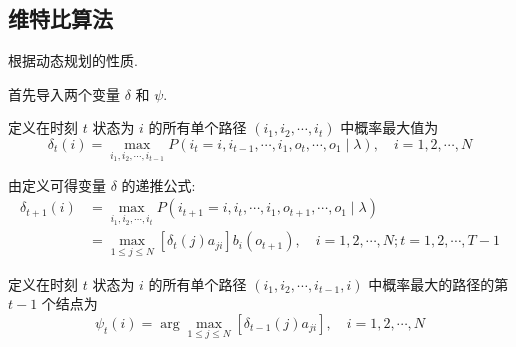 \subsection{维特比算法}

根据动态规划的性质. 

首先导入两个变量 $ \delta $ 和 $ \psi $. 

\begin{definition}
    定义在时刻 $ t $ 状态为 $ i $ 的所有单个路径 $ \left(i_{1}, i_{2}, \cdots, i_{t}\right) $ 中概率最大值为
$$
\delta_{t}(i)=\max _{i_1, i_{2}, \cdots, i_{t-1}} P\left(i_{t}=i, i_{t-1}, \cdots, i_{1}, o_{t}, \cdots, o_{1} \mid \lambda\right), \quad i=1,2, \cdots, N
$$
\end{definition}

\begin{corollary}
   由定义可得变量 $ \delta $ 的递推公式:
$$
\begin{aligned}
\delta_{t+1}(i) &=\max _{i_1, i_2, \cdots, i_{t}} P\left(i_{t+1}=i, i_{t}, \cdots, i_{1}, o_{t+1}, \cdots, o_{1} \mid \lambda\right) \\
&=\max _{1 \leqslant j \leqslant N}\left[\delta_{t}(j) a_{j i}\right] b_{i}\left(o_{t+1}\right), \quad i=1,2, \cdots, N ; t=1,2, \cdots, T-1
\end{aligned}
$$ 
\end{corollary}

\begin{definition}
    定义在时刻 $ t $ 状态为 $ i $ 的所有单个路径 $ \left(i_{1}, i_{2}, \cdots, i_{t-1}, i\right) $ 中概率最大的路径的第 $ t-1 $ 个结点为
$$
\psi_{t}(i)=\arg \max _{1 \leqslant j \leqslant N}\left[\delta_{t-1}(j) a_{j i}\right], \quad i=1,2, \cdots, N
$$
\end{definition}



